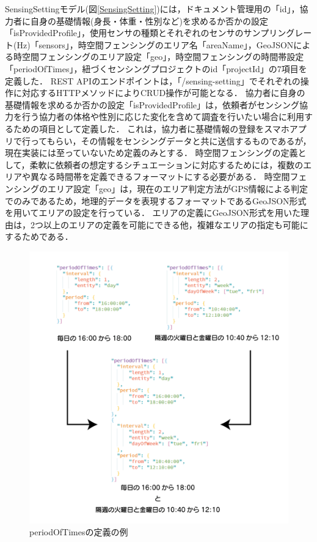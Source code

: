 SensingSettingモデル(図\ref{SensingSetting})には，ドキュメント管理用の「id」，協力者に自身の基礎情報(身長・体重・性別など)を求めるか否かの設定「isProvidedProfile」，使用センサの種類とそれぞれのセンサのサンプリングレート(Hz)「sensors」，時空間フェンシングのエリア名「areaName」，GeoJSONによる時空間フェンシングのエリア設定「geo」，時空間フェンシングの時間帯設定「periodOfTimes」，紐づくセンシングプロジェクトのid「projectId」の7項目を定義した．
REST APIのエンドポイントは，「/sensing-setting」でそれぞれの操作に対応するHTTPメソッドによりCRUD操作が可能となる．
協力者に自身の基礎情報を求めるか否かの設定「isProvidedProfile」は，依頼者がセンシング協力を行う協力者の体格や性別に応じた変化を含めて調査を行いたい場合に利用するための項目として定義した．
これは，協力者に基礎情報の登録をスマホアプリで行ってもらい，その情報をセンシングデータと共に送信するものであるが，現在実装には至っていないため定義のみとする．
時空間フェンシングの定義として，柔軟に依頼者の想定するシチュエーションに対応するためには，複数のエリアや異なる時間帯を定義できるフォーマットにする必要がある．
時空間フェンシングのエリア設定「geo」は，現在のエリア判定方法がGPS情報による判定でのみであるため，地理的データを表現するフォーマットであるGeoJSON形式を用いてエリアの設定を行っている．
エリアの定義にGeoJSON形式を用いた理由は，2つ以上のエリアの定義を可能にできる他，複雑なエリアの指定も可能にするためである．

\begin{figure}[H]
  \centering
  \includegraphics[width=150mm]{periodOfTimes.png}
  \caption{periodOfTimesの定義の例}
  \label{periodOfTimes}
\end{figure}

